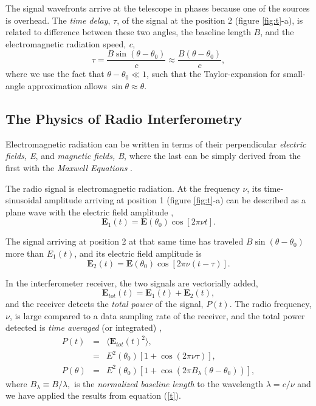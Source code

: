 The signal wavefronts arrive at the telescope in phases because one of the sources is overhead. The {\it time delay}, $\tau$, of the signal at the position 2 (figure \ref{fig:t}-a), is related to difference between these two angles, the baseline length $B$, and the electromagnetic radiation speed, {\it c},
\begin{equation}
\tau = \frac{B \sin(\theta - \theta_0)}{c} \approx \frac{B(\theta - \theta_0)}{c},
\label{t}
\end{equation}
where we use the fact that $\theta-\theta_0\ll1$, such that the Taylor-expansion for small-angle approximation allows $    \sin \theta \approx \theta $.

\bigskip

\subsection{The Physics of Radio Interferometry}

Electromagnetic radiation can be written in terms of their perpendicular {\it electric fields, E}, and {\it magnetic fields, B}, where the last can be simply derived from the first with the {\it Maxwell Equations} \cite{jackson}.

The radio signal is electromagnetic radiation. At the frequency $\nu$, its time-sinusoidal amplitude arriving at position 1 (figure \ref{fig:t}-a) can be described as a plane wave with the  electric field  amplitude \cite{sbu},
$$\mathbf E_1(t) = \mathbf E(\theta_0)   \cos [2\pi \nu t] .$$

The signal arriving at position 2 at that same time has traveled $B \sin(\theta - \theta_0)$ more than $E_1(t)$, and its electric field amplitude  is
$$\mathbf E_2(t) =  \mathbf E(\theta_0)  \cos [2\pi \nu (t-\tau)] .$$



In the  interferometer receiver, the two signals are vectorially added,
$$
\mathbf E_{tot}(t) =  \mathbf   E_1(t) + \mathbf E_2(t),
$$
 and the receiver detects the {\it total power} of the signal, $P(t)$.  The radio frequency, $\nu$, is large compared to a data sampling rate of the receiver, and the total power detected  is {\it time averaged} (or integrated) \cite{sbu} \cite {brand} \cite{jackson},
\begin{eqnarray}
P(t) &=& \langle\mathbf E_{tot}(t)^2 \rangle, \nonumber \\
& =&   E^2(\theta_0) [1+ \cos (2\pi \nu \tau)],  \nonumber \\ 
P(\theta)&=& E^2(\theta_0) [1+ \cos (2\pi B_{\lambda} (\theta - \theta_0))],
\label{p}
\end{eqnarray}
where 
$B_{\lambda} \equiv B/\lambda,$ 
is the {\it normalized baseline length} to the wavelength $\lambda = c/\nu$ and we have applied the results from equation (\ref{t}).

